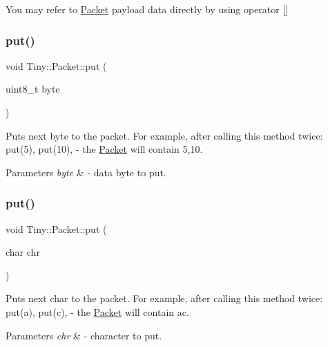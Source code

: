 You may refer to \hyperlink{classTiny_1_1Packet}{Packet} payload data directly by using operator \mbox{[}\mbox{]} \mbox{\label{classTiny_1_1Packet_a52c746f604ee6c0e4e78902b4cf710a9}} 
\subsubsection{\texorpdfstring{put()}{put()}\hspace{0.1cm}{\footnotesize\ttfamily [1/7]}}
{\footnotesize\ttfamily void Tiny\+::\+Packet\+::put (\begin{DoxyParamCaption}\item[{uint8\+\_\+t}]{byte }\end{DoxyParamCaption})\hspace{0.3cm}{\ttfamily [inline]}}

Puts next byte to the packet. For example, after calling this method twice\+: put(5), put(10), -\/ the \hyperlink{classTiny_1_1Packet}{Packet} will contain 5,10. 
\begin{DoxyParams}{Parameters}
{\em byte} & -\/ data byte to put. \\
\hline
\end{DoxyParams}
\mbox{\label{classTiny_1_1Packet_a6e1e5236908290f28c3b9a0818242b5b}} 
\subsubsection{\texorpdfstring{put()}{put()}\hspace{0.1cm}{\footnotesize\ttfamily [2/7]}}
{\footnotesize\ttfamily void Tiny\+::\+Packet\+::put (\begin{DoxyParamCaption}\item[{char}]{chr }\end{DoxyParamCaption})\hspace{0.3cm}{\ttfamily [inline]}}

Puts next char to the packet. For example, after calling this method twice\+: put(\textquotesingle{}a\textquotesingle{}), put(\textquotesingle{}c\textquotesingle{}), -\/ the \hyperlink{classTiny_1_1Packet}{Packet} will contain \textquotesingle{}ac\textquotesingle{}. 
\begin{DoxyParams}{Parameters}
{\em chr} & -\/ character to put. \\
\hline
\end{DoxyParams}
\mbox{\label{classTiny_1_1Packet_a0055b5d1c437104e38bf66ece8ab84ba}} 
